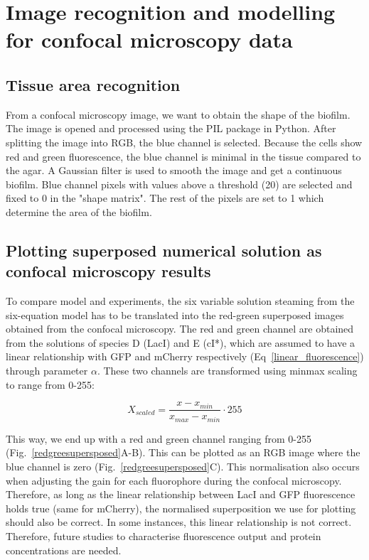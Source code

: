\section{Image recognition and modelling for confocal microscopy data}
\subsection{Tissue area recognition}\label{Tissue area recognition}
From a confocal microscopy image, we want to obtain the shape of the biofilm.
The image is opened and processed using the PIL package in Python.
After splitting the image into RGB, the blue channel is selected.
Because the cells show red and green fluorescence, the blue channel is minimal in the tissue compared to the agar.
A Gaussian filter is used to smooth the image and get a continuous biofilm.
Blue channel pixels with values above a threshold (20) are selected and fixed to 0 in the "shape matrix".
The rest of the pixels are set to 1 which determine the area of the biofilm.

\subsection{Plotting superposed numerical solution as confocal microscopy results}\label{Plotting superposed numerical solution as confocal microscopy results}
To compare model and experiments, the six variable solution steaming from the six-equation model has to be translated into the red-green superposed images obtained from the confocal microscopy.
The red and green channel are obtained from the solutions of species D (LacI) and E (cI*), which are assumed to have a linear relationship with GFP and mCherry respectively (Eq~\ref{linear_fluorescence}) through parameter $\alpha$.
These two channels are transformed using minmax scaling to range from 0-255:

\begin{equation}
    X_{scaled} = \frac{x-x_{min}}{x_{max}-x_{min}} \cdot 255
\end{equation}

This way, we end up with a red and green channel ranging from 0-255 (Fig.~\ref{redgreesupersposed}A-B).
This can be plotted as an RGB image where the blue channel is zero (Fig.~\ref{redgreesupersposed}C).
This normalisation also occurs when adjusting the gain for each fluorophore during the confocal microscopy.
Therefore, as long as the linear relationship between LacI and GFP fluorescence holds true (same for mCherry), the normalised superposition we use for plotting should also be correct.
In some instances, this linear relationship is not correct.
Therefore, future studies to characterise fluorescence output and protein concentrations are needed.


